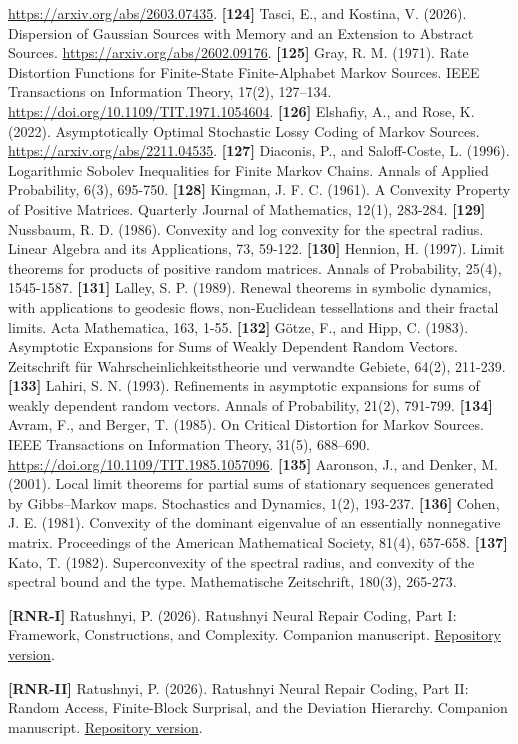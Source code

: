 \documentclass[
]{article}
\begin{document}
\url{https://arxiv.org/abs/2603.07435}.
\textbf{{[}124{]}} Tasci, E., and Kostina, V. (2026). Dispersion of Gaussian
Sources with Memory and an Extension to Abstract Sources.
\url{https://arxiv.org/abs/2602.09176}.
\textbf{{[}125{]}} Gray, R. M. (1971). Rate Distortion Functions for
Finite-State Finite-Alphabet Markov Sources. IEEE Transactions on
Information Theory, 17(2), 127--134.
\url{https://doi.org/10.1109/TIT.1971.1054604}.
\textbf{{[}126{]}} Elshafiy, A., and Rose, K. (2022). Asymptotically Optimal
Stochastic Lossy Coding of Markov Sources.
\url{https://arxiv.org/abs/2211.04535}.
\textbf{{[}127{]}} Diaconis, P., and Saloff-Coste, L. (1996). Logarithmic
Sobolev Inequalities for Finite Markov Chains. Annals of Applied
Probability, 6(3), 695-750.
\textbf{{[}128{]}} Kingman, J. F. C. (1961). A Convexity Property of
Positive Matrices. Quarterly Journal of Mathematics, 12(1), 283-284.
\textbf{{[}129{]}} Nussbaum, R. D. (1986). Convexity and log convexity
for the spectral radius. Linear Algebra and its Applications, 73,
59-122.
\textbf{{[}130{]}} Hennion, H. (1997). Limit theorems for products of
positive random matrices. Annals of Probability, 25(4), 1545-1587.
\textbf{{[}131{]}} Lalley, S. P. (1989). Renewal theorems in symbolic
dynamics, with applications to geodesic flows, non-Euclidean tessellations
and their fractal limits. Acta Mathematica, 163, 1-55.
\textbf{{[}132{]}} G\"otze, F., and Hipp, C. (1983). Asymptotic
Expansions for Sums of Weakly Dependent Random Vectors. Zeitschrift f\"ur
Wahrscheinlichkeitstheorie und verwandte Gebiete, 64(2), 211-239.
\textbf{{[}133{]}} Lahiri, S. N. (1993). Refinements in asymptotic
expansions for sums of weakly dependent random vectors. Annals of
Probability, 21(2), 791-799.
\textbf{{[}134{]}} Avram, F., and Berger, T. (1985). On
Critical Distortion for Markov Sources. IEEE Transactions on Information
Theory, 31(5), 688--690. \url{https://doi.org/10.1109/TIT.1985.1057096}.
\textbf{{[}135{]}} Aaronson, J., and Denker, M. (2001). Local limit
theorems for partial sums of stationary sequences generated by
Gibbs--Markov maps. Stochastics and Dynamics, 1(2), 193-237.
\textbf{{[}136{]}} Cohen, J. E. (1981). Convexity of the dominant
eigenvalue of an essentially nonnegative matrix. Proceedings of the
American Mathematical Society, 81(4), 657-658.
\textbf{{[}137{]}} Kato, T. (1982). Superconvexity of the spectral radius,
and convexity of the spectral bound and the type. Mathematische
Zeitschrift, 180(3), 265-273.

\textbf{{[}RNR-I{]}} Ratushnyi, P. (2026). Ratushnyi Neural Repair Coding,
Part I: Framework, Constructions, and Complexity.
Companion manuscript. \href{https://github.com/ratushnyi-labs/sci-rnr/blob/b89507a8f3fe11f34ff931c8081d2b0507695041/tex/papers/core/rnr_core.tex}{Repository version}.

\textbf{{[}RNR-II{]}} Ratushnyi, P. (2026). Ratushnyi Neural Repair Coding,
Part II: Random Access, Finite-Block Surprisal, and the Deviation Hierarchy.
Companion manuscript. \href{https://github.com/ratushnyi-labs/sci-rnr/blob/b89507a8f3fe11f34ff931c8081d2b0507695041/tex/papers/random_access/rnr_random_access.tex}{Repository version}.
\end{document}
